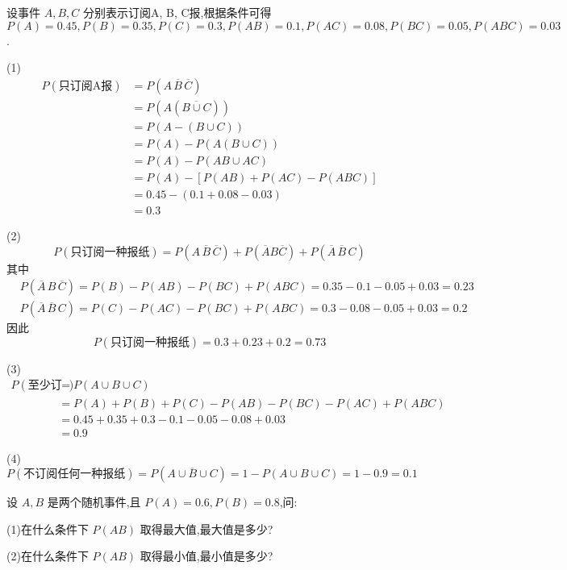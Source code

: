 \begin{solution}
    设事件 $A,B,C$ 分别表示订阅A, B, C报,根据条件可得 $P(A)=0.45, P(B)=0.35, P(C)=0.3, P(AB)=0.1, P(AC)=0.08, P(BC)=0.05, P(ABC)=0.03$.

    (1)
    $$
    \begin{aligned}
        P(\text{只订阅A报}) &= P(A \, \overline{B} \, \overline{C}) \\
        &= P(A (\overline{B \cup C})) \\
        &= P(A - (B \cup C)) \\
        &= P(A) - P(A(B \cup C)) \\
        &= P(A) - P(AB \cup AC) \\
        &= P(A) - [P(AB) + P(AC) - P(ABC)] \\
        &= 0.45 - (0.1+0.08-0.03) \\
        &= 0.3
    \end{aligned}
    $$

    (2)
    $$
    P(\text{只订阅一种报纸}) = P(A \, \overline{B} \, \overline{C}) + P(\overline{A} B \overline{C}) + P(\overline{A} \, \overline{B} \, C)
    $$
    其中
    $$
    \begin{aligned}
        & P(\overline{A} \, B \, \overline{C}) = P(B) - P(AB) - P(BC) + P(ABC) = 0.35-0.1-0.05+0.03 = 0.23 \\
        & P(\overline{A} \, \overline{B} \, C) = P(C) - P(AC) - P(BC) + P(ABC) = 0.3-0.08-0.05+0.03 = 0.2
    \end{aligned}
    $$
    因此
    $$
    P(\text{只订阅一种报纸}) = 0.3 + 0.23 + 0.2 = 0.73
    $$

    (3)
    $$
    \begin{aligned}
        P(\text{至少订阅一种报纸}) &= P(A \cup B \cup C) \\
        &= P(A) + P(B) + P(C) - P(AB) - P(BC) - P(AC) + P(ABC) \\
        &= 0.45 + 0.35 + 0.3 - 0.1 - 0.05 - 0.08 + 0.03 \\
        &=0.9
    \end{aligned}
    $$

    (4) $P(\text{不订阅任何一种报纸}) = P(\overline{A \cup B \cup C}) = 1 - P(A \cup B \cup C) = 1-0.9 = 0.1$
\end{solution}

\question 设 $A,B$ 是两个随机事件,且 $P(A)=0.6, P(B)=0.8$,问:

(1)在什么条件下 $P(AB)$ 取得最大值,最大值是多少?

(2)在什么条件下 $P(AB)$ 取得最小值,最小值是多少?

